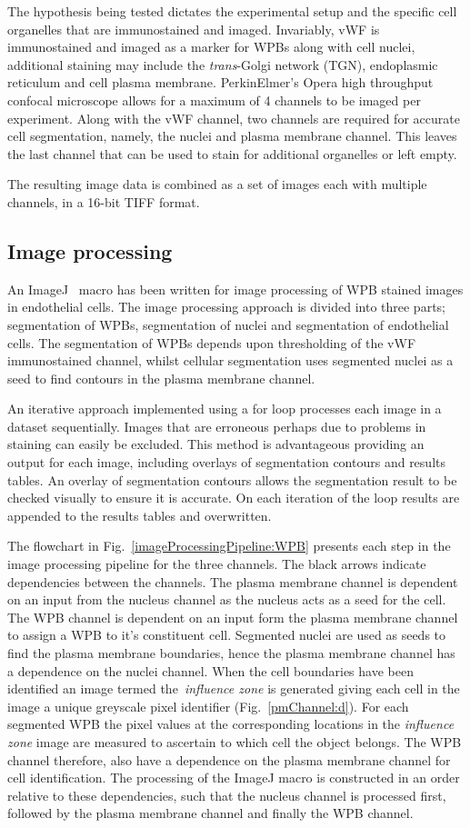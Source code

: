 The hypothesis being tested dictates the experimental setup and the specific cell organelles that are immunostained and imaged. Invariably, vWF is immunostained and imaged as a marker for WPBs along with cell nuclei, additional staining may include the \emph{trans}-Golgi network (TGN), endoplasmic reticulum and cell plasma membrane. PerkinElmer's Opera high throughput confocal microscope allows for a maximum of 4 channels to be imaged per experiment. Along with the vWF channel, two channels are required for accurate cell segmentation, namely, the nuclei and plasma membrane channel. This leaves the last channel that can be used to stain for additional organelles or left empty.

The resulting image data is combined as a set of images each with multiple channels, in a 16-bit TIFF format.
\subsection{Image processing}
An ImageJ~\cite{Schneider2012} macro has been written for image processing of WPB stained images in endothelial cells. The image processing approach is divided into three parts; segmentation of WPBs, segmentation of nuclei and segmentation of endothelial cells. The segmentation of WPBs depends upon thresholding of the vWF immunostained channel, whilst cellular segmentation uses segmented nuclei as a seed to find contours in the plasma membrane channel.

An iterative approach implemented using a for loop processes each image in a dataset sequentially. Images that are erroneous perhaps due to problems in staining can easily be excluded. This method is advantageous providing an output for each image, including overlays of segmentation contours and results tables. An overlay of segmentation contours allows the segmentation result to be checked visually to ensure it is accurate. On each iteration of the loop results are appended to the results tables and overwritten. 

The flowchart in Fig.~\ref{imageProcessingPipeline:WPB} presents each step in the image processing pipeline for the three channels. The black arrows indicate dependencies between the channels. The plasma membrane channel is dependent on an input from the nucleus channel as the nucleus acts as a seed for the cell. The WPB channel is dependent on an input form the plasma membrane channel to assign a WPB to it's constituent cell. Segmented nuclei are used as seeds to find the plasma membrane boundaries, hence the plasma membrane channel has a dependence on the nuclei channel. When the cell boundaries have been identified an image termed the~\emph{influence zone} is generated giving each cell in the image a unique greyscale pixel identifier (Fig.~\ref{pmChannel:d}). For each segmented WPB the pixel values at the corresponding locations in the \emph{influence zone} image are measured to ascertain to which cell the object belongs. The WPB channel therefore, also have a dependence on the plasma membrane channel for cell identification. The processing of the ImageJ macro is constructed in an order relative to these dependencies, such that the nucleus channel is processed first, followed by the plasma membrane channel and finally the WPB channel.

